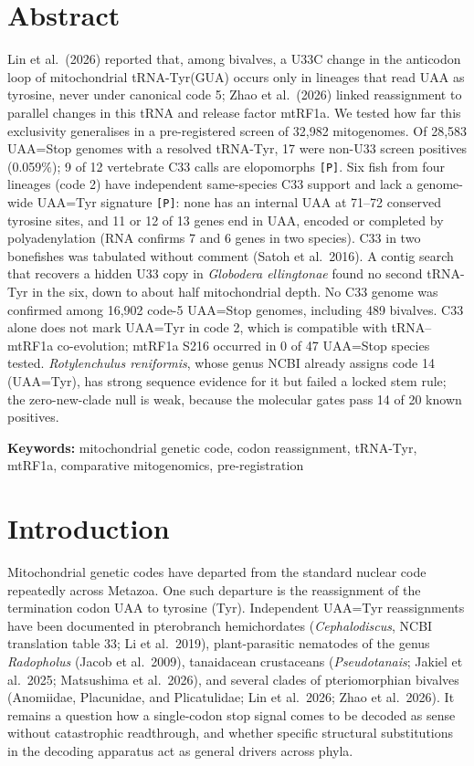 \documentclass[11pt, a4paper]{article}
\begin{document}
\section*{Abstract}
Lin et al.\ (2026) reported that, among bivalves, a U33C change in the anticodon loop of mitochondrial tRNA-Tyr(GUA) occurs only in lineages that read UAA as tyrosine, never under canonical code 5; Zhao et al.\ (2026) linked reassignment to parallel changes in this tRNA and release factor mtRF1a. We tested how far this exclusivity generalises in a pre-registered screen of 32,982 mitogenomes. Of 28,583 UAA=Stop genomes with a resolved tRNA-Tyr, 17 were non-U33 screen positives (0.059\%); 9 of 12 vertebrate C33 calls are elopomorphs \texttt{[P]}. Six fish from four lineages (code 2) have independent same-species C33 support and lack a genome-wide UAA=Tyr signature \texttt{[P]}: none has an internal UAA at 71--72 conserved tyrosine sites, and 11 or 12 of 13 genes end in UAA, encoded or completed by polyadenylation (RNA confirms 7 and 6 genes in two species). C33 in two bonefishes was tabulated without comment (Satoh et al.\ 2016). A contig search that recovers a hidden U33 copy in \textit{Globodera ellingtonae} found no second tRNA-Tyr in the six, down to about half mitochondrial depth. No C33 genome was confirmed among 16,902 code-5 UAA=Stop genomes, including 489 bivalves. C33 alone does not mark UAA=Tyr in code 2, which is compatible with tRNA--mtRF1a co-evolution; mtRF1a S216 occurred in 0 of 47 UAA=Stop species tested. \textit{Rotylenchulus reniformis}, whose genus NCBI already assigns code 14 (UAA=Tyr), has strong sequence evidence for it but failed a locked stem rule; the zero-new-clade null is weak, because the molecular gates pass 14 of 20 known positives.

\vspace{0.5em}
\noindent\textbf{Keywords:} mitochondrial genetic code, codon reassignment, tRNA-Tyr, mtRF1a, comparative mitogenomics, pre-registration

\section{Introduction}
Mitochondrial genetic codes have departed from the standard nuclear code repeatedly across Metazoa. One such departure is the reassignment of the termination codon UAA to tyrosine (Tyr). Independent UAA=Tyr reassignments have been documented in pterobranch hemichordates (\textit{Cephalodiscus}, NCBI translation table 33; Li et al.\ 2019), plant-parasitic nematodes of the genus \textit{Radopholus} (Jacob et al.\ 2009), tanaidacean crustaceans (\textit{Pseudotanais}; Jakiel et al.\ 2025; Matsushima et al.\ 2026), and several clades of pteriomorphian bivalves (Anomiidae, Placunidae, and Plicatulidae; Lin et al.\ 2026; Zhao et al.\ 2026). It remains a question how a single-codon stop signal comes to be decoded as sense without catastrophic readthrough, and whether specific structural substitutions in the decoding apparatus act as general drivers across phyla.
\end{document}
